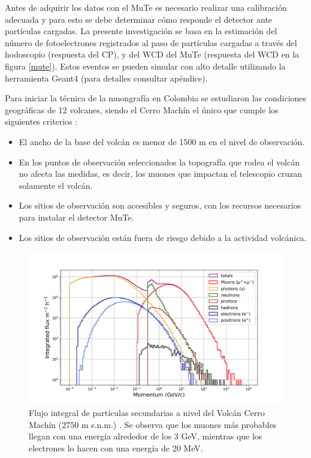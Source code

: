 \documentclass[12pt,oneside,openany,letter]{book}
\begin{document}
Antes de adquirir los datos con el MuTe es necesario realizar una calibración adecuada y para esto se debe determinar cómo responde el detector ante partículas cargadas. La presente investigación se basa en la estimación del número de fotoelectrones registrados al paso de partículas cargadas a trav\'es del hodoscopio (respuesta del CP), y del WCD del MuTe (respuesta del WCD en la figura \ref{mute}). Estos eventos se pueden simular con alto detalle utilizando la herramienta Geant4 \cite{Geant4} (para detalles consultar apéndice).

Para iniciar la técnica de la muongrafía en Colombia se estudiaron las condiciones geogr\'aficas de 12 volcanes, siendo el Cerro Machín el \'unico que cumple los siguientes criterios \cite{MuTeSites}:
\begin{itemize}
\item El ancho de la base del volcán es menor de 1500 m en el nivel de observación.
\item En los puntos de observación seleccionados la topografía que rodea el volcán no afecta las medidas, es decir, los muones que impactan el telescopio cruzan solamente el volcán.
\item Los sitios de observación son accesibles y seguros, con los recursos necesarios para instalar el detector MuTe. 
\item Los sitios de observación están fuera de riesgo debido a la actividad volcánica. 
\end{itemize}
\begin{figure}[h!]
    \centering
        \includegraphics[scale=0.55]{countsenergies.png}
   \caption[Flujo integral de partículas secundarias a nivel del Volcán Cerro Machín]{Flujo integral de partículas secundarias a nivel del Volcán Cerro Machín (2750 m s.n.m.) \cite{MuTeSites}. Se observa que los muones más probables llegan con una energía alrededor de los 3 GeV, mientras que los electrones lo hacen con una energía de 20 MeV.}\label{flujo}
\end{figure}
\end{document}
